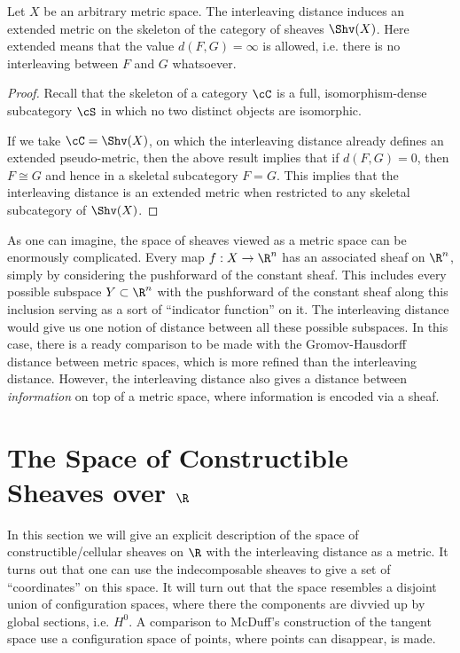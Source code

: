 \begin{thm}
Let $X$ be an arbitrary metric space. The interleaving distance induces an extended metric on the skeleton of the category of sheaves $\Shv(X)$. Here extended means that the value $d(F,G)=\infty$ is allowed, i.e. there is no interleaving between $F$ and $G$ whatsoever.
\end{thm}
\begin{proof}
Recall that the skeleton of a category $\cC$ is a full, isomorphism-dense subcategory $\cS$ in which no two distinct objects are isomorphic. 

If we take $\cC=\Shv(X)$, on which the interleaving distance already defines an extended pseudo-metric, then the above result implies that if $d(F,G)=0$, then $F\cong G$ and hence in a skeletal subcategory $F=G$. This implies that the interleaving distance is an extended metric when restricted to any skeletal subcategory of $\Shv(X)$.
\end{proof}

As one can imagine, the space of sheaves viewed as a metric space can be enormously complicated. Every map $f:X\to\R^n$ has an associated sheaf on $\R^n$, simply by considering the pushforward of the constant sheaf. This includes every possible subspace $Y\subset \R^n$ with the pushforward of the constant sheaf along this inclusion serving as a sort of ``indicator function'' on it. The interleaving distance would give us one notion of distance between all these possible subspaces. In this case, there is a ready comparison to be made with the Gromov-Hausdorff distance between metric spaces, which is more refined than the interleaving distance. However, the interleaving distance also gives a distance between \emph{information} on top of a metric space, where information is encoded via a sheaf. 

\section{The Space of Constructible Sheaves over $\R$}

In this section we will give an explicit description of the space of constructible/cellular sheaves on $\R$ with the interleaving distance as a metric. It turns out that one can use the indecomposable sheaves to give a set of ``coordinates'' on this space. It will turn out that the space resembles a disjoint union of configuration spaces, where there the components are divvied up by global sections, i.e. $H^0$. A comparison to McDuff's construction of the tangent space use a configuration space of points, where points can disappear, is made.

